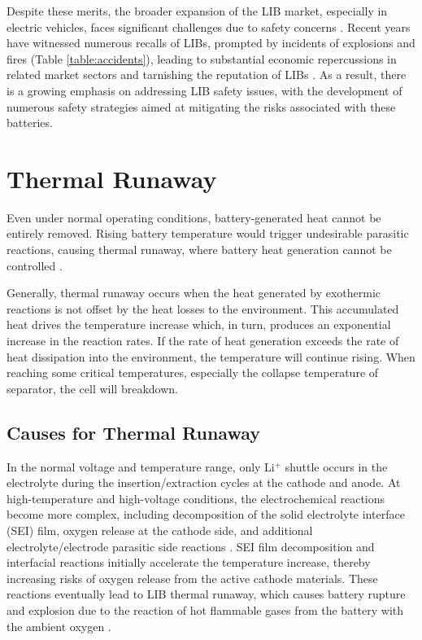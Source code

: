 Despite these merits, the broader expansion of the LIB market, especially in electric vehicles, faces significant challenges due to safety concerns \cite{love2018innovating,schipper2016recent,feng2018thermal}. Recent years have witnessed numerous recalls of LIBs, prompted by incidents of explosions and fires (Table \ref{table:accidents}), leading to substantial economic repercussions in related market sectors and tarnishing the reputation of LIBs \cite{chen2021review,balakrishnan2006safety}. As a result, there is a growing emphasis on addressing LIB safety issues, with the development of numerous safety strategies aimed at mitigating the risks associated with these batteries.

\section{Thermal Runaway}
\label{sec:thermal-runaway}

Even under normal operating conditions, battery-generated heat cannot be entirely removed. Rising battery temperature would trigger undesirable parasitic reactions, causing thermal runaway, where battery heat generation cannot be controlled \cite{wang2012thermal}.

Generally, thermal runaway occurs when the heat generated by exothermic reactions is not offset by the heat losses to the environment. This accumulated heat drives the temperature increase which, in turn, produces an exponential increase in the reaction rates. If the rate of heat generation exceeds the rate of heat dissipation into the environment, the temperature will continue rising. When reaching some critical temperatures, especially the collapse temperature of separator, the cell will breakdown.

\subsection{Causes for Thermal Runaway}
In the normal voltage and temperature range, only Li$^+$ shuttle occurs in the electrolyte during the insertion/extraction cycles at the cathode and anode. At high-temperature and high-voltage conditions, the electrochemical reactions become more complex, including decomposition of the solid electrolyte interface (SEI) film, oxygen release at the cathode side, and additional electrolyte/electrode parasitic side reactions \cite{maleki1999thermal}. SEI film decomposition and interfacial reactions initially accelerate the temperature increase, thereby increasing risks of oxygen release from the active cathode materials. These reactions eventually lead to LIB thermal runaway, which causes battery rupture and explosion due to the reaction of hot flammable gases from the battery with the ambient oxygen \cite{finegan2016investigating}.

